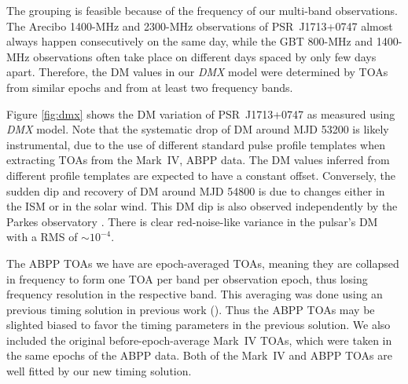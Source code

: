 The grouping is feasible because of the frequency of our multi-band
observations.
The Arecibo 1400-MHz and 2300-MHz observations of PSR~J1713+0747 almost
always happen consecutively on
the same day, while the GBT 800-MHz and 1400-MHz observations often take place on different
days spaced by only few days apart.
Therefore, the DM values in our {\it DMX} model were determined by TOAs from
similar epochs and from at least two frequency bands. 

Figure \ref{fig:dmx} shows the DM variation of PSR~J1713+0747 as measured
using {\it DMX} model.
Note that the systematic drop of DM around MJD 53200 is likely instrumental, due to
the use of different standard pulse profile templates when extracting 
TOAs from the Mark~IV, ABPP data. The DM values inferred from different
profile templates are expected to have a constant offset.
Conversely, the sudden dip and recovery of DM around MJD 54800 is 
due to changes either in the ISM or in the solar wind. This DM dip is also
observed independently by the Parkes observatory \citep{kcs+13}.
There is clear red-noise-like variance in the pulsar's DM with a RMS of
$\sim10^{-4}$. 

The ABPP TOAs we have are epoch-averaged TOAs, meaning they are collapsed in frequency to form one TOA per band per observation epoch, thus losing frequency resolution in the respective band. 
This averaging was done using an previous timing solution in previous work
(\citep{sns+05}). Thus the ABPP TOAs may be slighted biased to favor the
timing parameters in the previous solution. We also included the original
before-epoch-average Mark~IV TOAs, which were taken in the same epochs of the
ABPP data. Both of the Mark~IV and ABPP  TOAs are well fitted by our new
timing solution.

